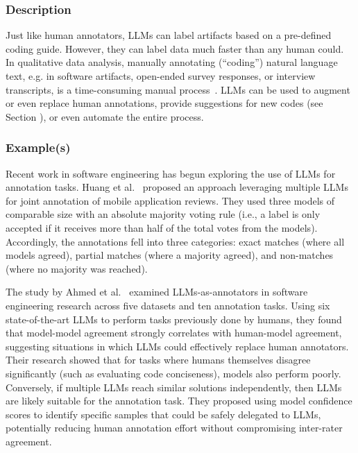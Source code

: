 \subsubsection{Description}

Just like human annotators, LLMs can label artifacts based on a pre-defined coding guide.
However, they can label data much faster than any human could. 
In qualitative data analysis, manually annotating (``coding'') natural language text, e.g. in software artifacts, open-ended survey responses, or interview transcripts, is a time-consuming manual process~\cite{DBLP:journals/ase/BanoHZT24}.
LLMs can be used to augment or even replace human annotations, provide suggestions for new codes (see Section \synthesis), or even automate the entire process.

\subsubsection{Example(s)}

Recent work in software engineering has begun exploring the use of LLMs for annotation tasks.
Huang et al.~\cite{Huang2023Enhancing} proposed an approach leveraging multiple LLMs for joint annotation of mobile application reviews. 
They used three models of comparable size with an absolute majority voting rule (i.e., a label is only accepted if it receives more than half of the total votes from the models).
Accordingly, the annotations fell into three categories: exact matches (where all models agreed), partial matches (where a majority agreed), and non-matches (where no majority was reached).

The study by Ahmed et al.~\cite{Ahmed2025} examined LLMs-as-annotators in software engineering research across five datasets and ten annotation tasks. Using six state-of-the-art LLMs to perform tasks previously done by humans, they found that model-model agreement strongly correlates with human-model agreement, suggesting situations in which LLMs could effectively replace human annotators. Their research showed that for tasks where humans themselves disagree significantly (such as evaluating code conciseness), models also perform poorly. Conversely, if multiple LLMs reach similar solutions independently, then LLMs are likely suitable for the annotation task. They proposed using model confidence scores to identify specific samples that could be safely delegated to LLMs, potentially reducing human annotation effort without compromising inter-rater agreement.

